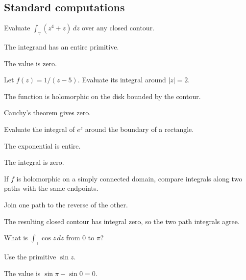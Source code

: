 \subsection*{Standard computations}

\begin{exercise}\label{exr:iv05-expand-01}
Evaluate \(\int_\gamma (z^4+z)\,dz\) over any closed contour.
\end{exercise}
\begin{hint}
The integrand has an entire primitive.
\end{hint}
\begin{solution}
The value is zero.
\end{solution}

\begin{exercise}\label{exr:iv05-expand-02}
Let \(f(z)=1/(z-5)\). Evaluate its integral around \(|z|=2\).
\end{exercise}
\begin{hint}
The function is holomorphic on the disk bounded by the contour.
\end{hint}
\begin{solution}
Cauchy's theorem gives zero.
\end{solution}

\begin{exercise}[Rectangle]\label{exr:iv05-expand-03}
Evaluate the integral of \(e^z\) around the boundary of a rectangle.
\end{exercise}
\begin{hint}
The exponential is entire.
\end{hint}
\begin{solution}
The integral is zero.
\end{solution}

\begin{exercise}\label{exr:iv05-expand-04}
If \(f\) is holomorphic on a simply connected domain, compare integrals along two paths with the same endpoints.
\end{exercise}
\begin{hint}
Join one path to the reverse of the other.
\end{hint}
\begin{solution}
The resulting closed contour has integral zero, so the two path integrals agree.
\end{solution}

\begin{exercise}\label{exr:iv05-expand-05}
What is \(\int_\gamma \cos z\,dz\) from \(0\) to \(\pi\)?
\end{exercise}
\begin{hint}
Use the primitive \(\sin z\).
\end{hint}
\begin{solution}
The value is \(\sin\pi-\sin0=0\).
\end{solution}

